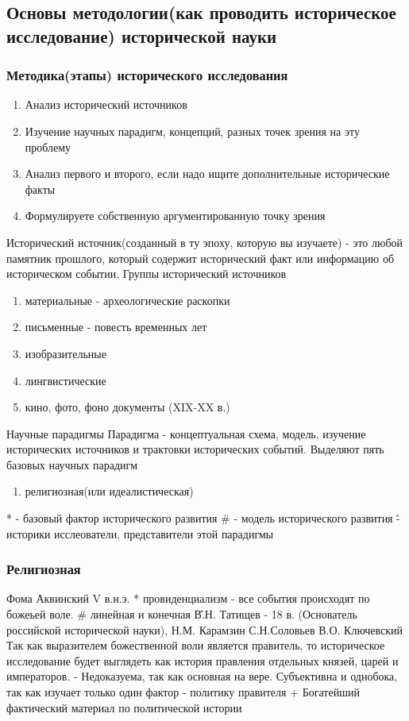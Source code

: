 \documentclass[a4paper]{article}
\begin{document}
\subsection{Основы методологии(как проводить историческое исследование)
 исторической науки}

\subsubsection{Методика(этапы) исторического исследования}

\begin{enumerate}
\item Анализ исторический источников
\item Изучение научных парадигм, концепций, разных точек зрения на эту проблему
\item Анализ первого и второго, если надо ищите дополнительные исторические факты
\item Формулируете собственную аргументированную точку зрения
\end{enumerate}

Исторический источник(созданный в ту эпоху, которую вы изучаете) - это любой памятник прошлого, который содержит исторический факт или информацию об историческом событии.
Группы исторический источников

\begin{enumerate}
\item материальные - археологические раскопки
\item письменные - повесть временных лет
\item изобразительные
\item лингвистические
\item кино, фото, фоно документы (XIX-XX в.)
\end{enumerate}

Научные парадигмы
Парадигма - концептуальная схема, модель, изучение исторических источников и трактовки исторических событий.
Выделяют пять базовых научных парадигм
\begin{enumerate}
\item религиозная(или идеалистическая)
\end{enumerate}
* - базовый фактор исторического развития
\# - модель исторического развития
\^ - историки исслеователи, представители этой парадигмы 
\subsubsection{Религиозная}
Фома Аквинский V в.н.э.
* провиденциализм - все события происходят по божеьей воле.
\# линейная и конечная
\^ В.Н. Татищев - 18 в. (Основатель российской исторической науки),
  Н.М. Карамзин
  С.Н.Соловьев
  В.О. Ключевский
Так как выразителем божественной воли является правитель, то историческое исследование
будет выглядеть как история правления отдельных князей, царей и императоров.
- Недоказуема, так как основная на вере. Субъективна и однобока, так как изучает только один фактор - политику правителя
+ Богатейший фактический материал по политической истории
\end{document}
